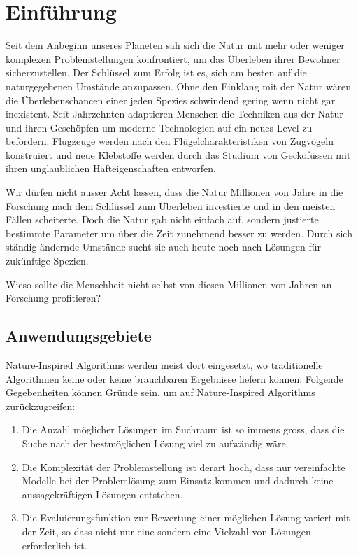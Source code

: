 \chapter{Einführung}

Seit dem Anbeginn unseres Planeten sah sich die Natur mit mehr oder weniger
komplexen Problemstellungen konfrontiert, um das Überleben ihrer Bewohner
sicherzustellen. Der Schlüssel zum Erfolg ist es, sich am besten auf die
naturgegebenen Umstände anzupassen. Ohne den Einklang mit der Natur wären die
Überlebenschancen einer jeden Spezies schwindend gering wenn nicht gar inexistent.
Seit Jahrzehnten adaptieren Menschen die Techniken aus der Natur und ihren Geschöpfen
um moderne Technologien auf ein neues Level zu befördern. Flugzeuge werden nach den
Flügelcharakteristiken von Zugvögeln konstruiert und neue Klebstoffe werden durch das
Studium von Geckofüssen mit ihren unglaublichen Hafteigenschaften entworfen. \cite{Cro14}

Wir dürfen nicht ausser Acht lassen, dass die Natur Millionen von Jahre in die Forschung
nach dem Schlüssel zum Überleben investierte und in den meisten Fällen scheiterte. Doch
die Natur gab nicht einfach auf, sondern justierte bestimmte Parameter um über die Zeit
zunehmend besser zu werden. Durch sich ständig ändernde Umstände sucht sie auch heute noch
nach Lösungen für zukünftige Spezien.

Wieso sollte die Menschheit nicht selbst von diesen Millionen von Jahren an Forschung profitieren?

\section{Anwendungsgebiete}

Nature-Inspired Algorithms werden meist dort eingesetzt, wo traditionelle Algorithmen keine oder
keine brauchbaren Ergebnisse liefern können. Folgende Gegebenheiten können Gründe sein, um auf
Nature-Inspired Algorithms zurückzugreifen:

\begin{enumerate}
    \item Die Anzahl möglicher Lösungen im Suchraum ist so immens gross, dass die Suche nach der bestmöglichen
          Lösung viel zu aufwändig wäre.
    \item Die Komplexität der Problemstellung ist derart hoch, dass nur vereinfachte Modelle bei der Problemlösung
          zum Einsatz kommen und dadurch keine aussagekräftigen Lösungen entstehen.
    \item Die Evaluierungsfunktion zur Bewertung einer möglichen Lösung variert mit der Zeit, so dass nicht nur eine
          sondern eine Vielzahl von Lösungen erforderlich ist.
\end{enumerate}

